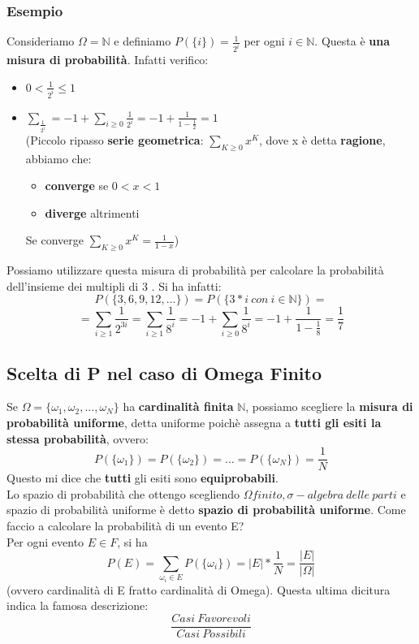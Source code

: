 \documentclass{report}
\newcommand{\N}{\mathbb{N}}
\begin{document}
\subsubsection{Esempio}
Consideriamo \(\Omega = \N\) e definiamo \(P(\{i\}) = \frac{1}{2^i} \) per ogni \(i \in \N\). Questa è \textbf{una misura di probabilità}. Infatti verifico: \begin{itemize}
    \item \(0 < \frac{1}{2^i} \leq 1\)
    \item \(\sum_{\frac{1}{2^i}} = -1 + \sum_{i \geq 0}\frac{1}{2^i} = -1 + \frac{1}{1 - \frac{1}{2}} = 1 \)\\ 
    (Piccolo ripasso \textbf{serie geometrica}: \(\sum_{K \geq 0}x^K\), dove x è detta \textbf{ragione}, abbiamo che: \begin{itemize}
        \item \textbf{converge} se \(0 < x < 1\)
        \item \textbf{diverge} altrimenti
    \end{itemize}
    Se converge \(\sum_{K \geq 0}x^K = \frac{1}{1-x}\))
\end{itemize}
Possiamo utilizzare questa misura di probabilità per calcolare la probabilità dell'insieme dei multipli di 3 . Si ha infatti: \[P(\{3, 6, 9, 12, ...\}) = P(\{3*i\ con\ i \in \N\}) = \] \[= \sum_{i \geq 1} \frac{1}{2^{3i}} = \sum_{i \geq 1} \frac{1}{8^i} = -1 + \sum_{i \geq 0} \frac{1}{8^i} = -1 + \frac{1}{1 - \frac{1}{8}} = \frac{1}{7}\]
\subsection{Scelta di P nel caso di Omega Finito}
Se \(\Omega = \{\omega_1, \omega_2, ..., \omega_N\}\) ha \textbf{cardinalità finita} \(\N\), possiamo scegliere la \textbf{misura di probabilità uniforme}, detta uniforme poichè assegna a \textbf{tutti gli esiti la stessa probabilità}, ovvero: \[P(\{\omega_1\}) = P(\{\omega_2\}) = ... = P(\{\omega_N\}) = \frac{1}{N}\] Questo mi dice che \textbf{tutti} gli esiti sono \textbf{equiprobabili}.\\
Lo spazio di probabilità che ottengo scegliendo \(\Omega finito, \sigma-algebra\ delle\ parti\) e spazio di probabilità uniforme è detto \textbf{spazio di probabilità uniforme}. Come faccio a calcolare la probabilità di un evento E?\\
Per ogni evento \(E \in \textit{F}\), si ha \[P(E) = \sum_{\omega_i \in E} P(\{\omega_i\}) = |E| * \frac{1}{N} = \frac{|E|}{|\Omega|}\] (ovvero cardinalità di E fratto cardinalità di Omega). Questa ultima dicitura indica la famosa descrizione: \[\frac{Casi\ Favorevoli}{Casi\ Possibili}\]
\end{document}
